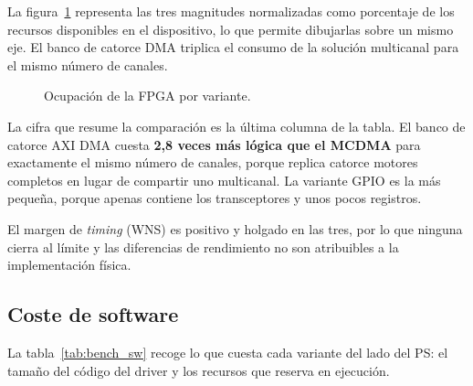 La figura~\ref{fig:bench_hw} representa las tres magnitudes normalizadas como porcentaje de los
recursos disponibles en el dispositivo, lo que permite dibujarlas sobre un mismo eje. El banco de
catorce DMA triplica el consumo de la solución multicanal para el mismo número de canales.

\begin{figure}[htbp]
    \centering
    \caption{Ocupación de la FPGA por variante.}
    \label{fig:bench_hw}
\end{figure}

La cifra que resume la comparación es la última columna de la tabla. El banco de catorce AXI DMA cuesta
\textbf{2,8 veces más lógica que el MCDMA} para exactamente el mismo número de canales, porque
replica catorce motores completos en lugar de compartir uno multicanal. La variante GPIO es la más
pequeña, porque apenas contiene los transceptores y unos pocos registros.

El margen de \textit{timing} (WNS) es positivo y holgado en las tres, por lo que ninguna cierra
al límite y las diferencias de rendimiento no son atribuibles a la implementación física.

\subsection{Coste de software}

La tabla~\ref{tab:bench_sw} recoge lo que cuesta cada variante del lado del PS: el tamaño del
código del driver y los recursos que reserva en ejecución.

